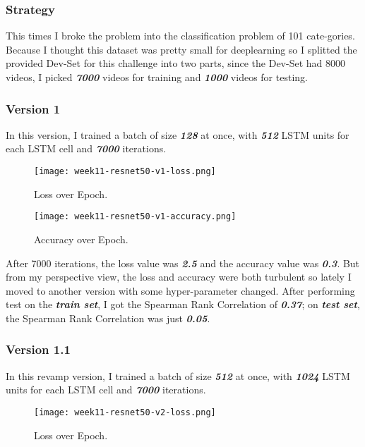 \subsubsection{Strategy}
This times I broke the problem into the classification problem of 101 cate-gories. Because I thought this dataset was pretty small for deeplearning so I splitted the provided Dev-Set for this challenge into two parts, since the Dev-Set had 8000 videos, I picked \textbf{\emph{7000}} videos for training and \textbf{\emph{1000}} videos for testing.

\subsubsection{Version 1}
In this version, I trained a batch of size \textbf{\emph{128}} at once, with \textbf{\emph{512}} LSTM units for each LSTM cell and \textbf{\emph{7000}} iterations.

\begin{figure}[!ht]
\centering
\texttt{[image: week11-resnet50-v1-loss.png]}
\caption{Loss over Epoch.}
\end{figure}

\begin{figure}[!ht]
\centering
\texttt{[image: week11-resnet50-v1-accuracy.png]}
\caption{Accuracy over Epoch.}
\end{figure}

After 7000 iterations, the loss value was \textbf{\emph{2.5}} and the accuracy value was \textbf{\emph{0.3}}. But from my perspective view, the loss and accuracy were both turbulent so lately I moved to another version with some hyper-parameter changed. After performing test on the \textbf{\emph{train set}}, I got the Spearman Rank Correlation of \textbf{\emph{0.37}}; on \textbf{\emph{test set}}, the Spearman Rank Correlation was just \textbf{\emph{0.05}}.

\subsubsection{Version 1.1}
In this revamp version, I trained a batch of size \textbf{\emph{512}} at once, with \textbf{\emph{1024}} LSTM units for each LSTM cell and \textbf{\emph{7000}} iterations.

\begin{figure}[!ht]
\centering
\texttt{[image: week11-resnet50-v2-loss.png]}
\caption{Loss over Epoch.}
\end{figure}

